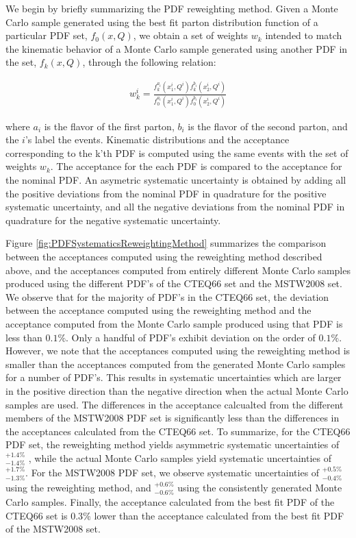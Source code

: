 \documentclass{cmspaper}
\begin{document}
We begin by briefly summarizing the PDF reweighting method. Given a Monte Carlo sample generated using the best fit parton distribution function of a particular PDF set, $f_{0}(x,Q)$, we obtain a set of weights $w_{k}$ intended to match the kinematic behavior of a Monte Carlo sample generated using another PDF in the set, $f_{k}(x,Q)$, through the following relation:

\begin{eqnarray}
  w^{i}_{k} = \frac{f^{a_{i}}_{k}(x^{i}_{1},Q^{i})f^{b_{i}}_{k}(x^{i}_{2},Q^{i})}{f^{a_{i}}_{0}(x^{i}_{1},Q^{i})f^{b_{i}}_{0}(x^{i}_{2},Q^{i})}
  \label{eqn:PDFReweighting}  
\end{eqnarray}

where  $a_{i}$ is the flavor of the first parton, $b_{i}$ is the flavor of the second parton, and the $i$'s label the events. Kinematic distributions and the acceptance corresponding to the k'th PDF is computed using the same events with the set of weights $w_{k}$. The acceptance for the each PDF is compared to the acceptance for the nominal PDF. An asymetric systematic uncertainty is obtained by adding all the positive deviations from the nominal PDF in quadrature for the positive systematic uncertainty, and all the negative deviations from the nominal PDF in quadrature for the negative systematic uncertainty. 

Figure \ref{fig:PDFSystematicsReweightingMethod} summarizes the comparison between the acceptances computed using the reweighting method described above, and the acceptances computed from entirely different Monte Carlo samples produced using the different PDF's of the CTEQ66 set and the MSTW2008 set. We observe that for the majority of PDF's in the CTEQ66 set, the deviation between the acceptance computed using the reweighting method and the acceptance computed from the Monte Carlo sample produced using that PDF is less than $0.1\%$. Only a handful of PDF's exhibit deviation on the order of $0.1\%$. However, we note that the acceptances computed using the reweighting method is smaller than the acceptances computed from the generated Monte Carlo samples for a number of PDF's. This results in systematic uncertainties which are larger in the positive direction than the negative direction when the actual Monte Carlo samples are used. The differences in the acceptance calcualted from the different members of the MSTW2008 PDF set is significantly less than the differences in the acceptances calculated from the CTEQ66 set. To summarize, for the CTEQ66 PDF set, the reweighting method yields asymmetric systematic uncertainties of $^{+1.4 \%}_{- 1.4 \%}$ , while the actual Monte Carlo samples yield systematic uncertainties of $^{+1.7 \%}_{- 1.3 \%}$.  For the MSTW2008 PDF set, we observe systematic uncertainties of $^{+0.5 \%}_{- 0.4 \%}$ using the reweighting method, and $^{+0.6 \%}_{- 0.6 \%}$ using the consistently generated Monte Carlo samples. Finally, the acceptance calculated from the best fit PDF of the CTEQ66 set is $0.3\%$ lower than the acceptance calculated from the best fit PDF of the MSTW2008 set.
\end{document}
